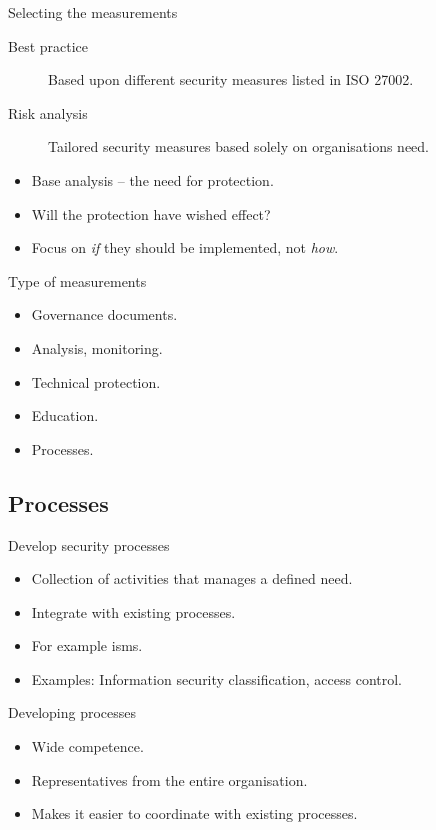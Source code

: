 \documentclass{beamer}
\begin{document}
\begin{frame}{Selecting the measurements}
  \begin{description}
    \item[Best practice] Based upon different security measures listed in ISO
      27002.
    \item[Risk analysis] Tailored security measures based solely on
      organisations need.
  \end{description}
  \begin{itemize}
    \item Base analysis -- the need for protection.
    \item Will the protection have wished effect?
    \item Focus on \emph{if} they should be implemented, not \emph{how}.
  \end{itemize}
\end{frame}
\begin{frame}{Type of measurements}
  \begin{itemize}
    \item Governance documents.
    \item Analysis, monitoring.
    \item Technical protection.
    \item Education.
    \item Processes.
  \end{itemize}
\end{frame}

\subsection{Processes}
\begin{frame}{Develop security processes}
  \begin{itemize}
    \item Collection of activities that manages a defined need.
    \item Integrate with existing processes.
    \item For example \ac{isms}.
    \item Examples: Information security classification, access control.
  \end{itemize}
\end{frame}
\begin{frame}{Developing processes}
  \begin{itemize}
    \item Wide competence.
    \item Representatives from the entire organisation.
    \item Makes it easier to coordinate with existing processes.
  \end{itemize}
\end{frame}
\end{document}
